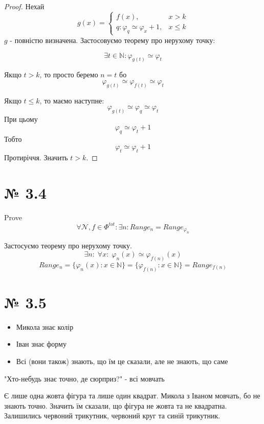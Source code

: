 \documentclass[11pt, a4paper]{article} %
\begin{document}
\begin{proof}
    Нехай 
    $$g(x) = \begin{cases}
        f(x), & x>k \\
        q : \varphi_q \simeq \varphi_x + 1, & x\le k
    \end{cases}$$
    $g$ - повністю визначена. Застосовуємо теорему про нерухому точку:

    $$\exists t\in\mathbb{N}: \varphi_{g(t)} \simeq \varphi_t$$
    
    Якщо $t > k$, то просто беремо $n = t$ бо
    $$\varphi_{g(t)} \simeq \varphi_{f(t)} \simeq \varphi_t$$

    Якщо $t \le k$, то маємо наступне:
    $$\varphi_{g(t)} \simeq \varphi_{q} \simeq \varphi_t$$
    При цьому 
    $$\varphi_q \simeq \varphi_t + 1$$
    Тобто 
    $$\varphi_t \simeq \varphi_t + 1$$
    Протиріччя. Значить $t > k$.
\end{proof}


\section*{№ 3.4}
\begin{mdframed}
    Prove
    $$\forall \mathcal N, f \in \Phi^{tot}: \exists n: Range_n = Range_{\varphi_n}$$
\end{mdframed}
Застосуємо теорему про нерухому точку.
$$\exists n:\; \forall x:\; \varphi_n(x) \simeq \varphi_{f(n)}(x)$$
$$Range_n = \{\varphi_n(x) : x \in \mathbb N\} = \{\varphi_{f(n)} : x \in \mathbb{N}\} = Range_{f(n)}$$
\qedsymbol

\section*{№ 3.5}
\begin{mdframed}
    \begin{itemize}
        \item Микола знає колір
        \item Іван знає форму
        \item Всі (вони також) знають, що їм це сказали, але не знають, що саме
    \end{itemize}
\end{mdframed}
"Хто-небудь знає точно, де сюрприз?" - всі мовчать

Є лише одна жовта фігура та лише один квадрат. Микола з Іваном мовчать, бо не знають точно. 
Значить їм сказали, що фігура не жовта та не квадратна. \\ 
Залишились червоний трикутник, червоний круг та синій трикутник. 
\end{document}
